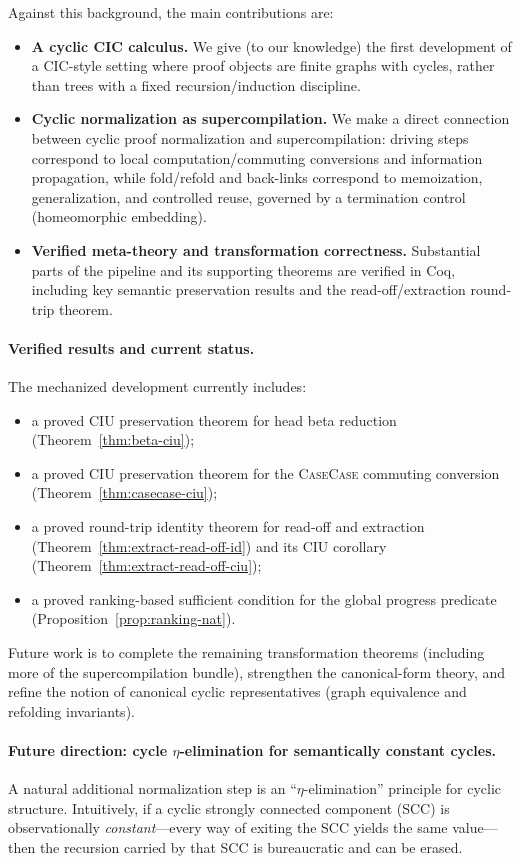 Against this background, the main contributions are:
\begin{itemize}
\item \textbf{A cyclic CIC calculus.}
  We give (to our knowledge) the first development of a CIC-style setting where proof objects are finite graphs with cycles, rather than trees with a fixed recursion/induction discipline.
\item \textbf{Cyclic normalization as supercompilation.}
  We make a direct connection between cyclic proof normalization and supercompilation: driving steps correspond to local computation/commuting conversions and information propagation, while fold/refold and back-links correspond to memoization, generalization, and controlled reuse, governed by a termination control (homeomorphic embedding).
\item \textbf{Verified meta-theory and transformation correctness.}
  Substantial parts of the pipeline and its supporting theorems are verified in Coq, including key semantic preservation results and the read-off/extraction round-trip theorem.
\end{itemize}

\paragraph{Verified results and current status.}
The mechanized development currently includes:
\begin{itemize}
\item a proved CIU preservation theorem for head beta reduction (Theorem~\ref{thm:beta-ciu});
\item a proved CIU preservation theorem for the \textsc{CaseCase} commuting conversion (Theorem~\ref{thm:casecase-ciu});
\item a proved round-trip identity theorem for read-off and extraction (Theorem~\ref{thm:extract-read-off-id}) and its CIU corollary (Theorem~\ref{thm:extract-read-off-ciu});
\item a proved ranking-based sufficient condition for the global progress predicate (Proposition~\ref{prop:ranking-nat}).
\end{itemize}

Future work is to complete the remaining transformation theorems (including more of the supercompilation bundle), strengthen the canonical-form theory, and refine the notion of canonical cyclic representatives (graph equivalence and refolding invariants).

\paragraph{Future direction: cycle \(\eta\)-elimination for semantically constant cycles.}
A natural additional normalization step is an ``\(\eta\)-elimination'' principle for cyclic structure.
Intuitively, if a cyclic strongly connected component (SCC) is observationally \emph{constant}---every way of exiting the SCC yields the same value---then the recursion carried by that SCC is bureaucratic and can be erased.

